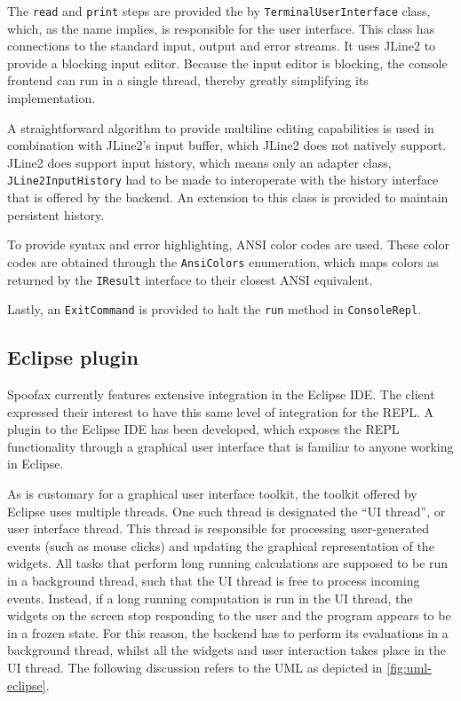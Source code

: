 The \texttt{read} and \texttt{print} steps are provided
the by \texttt{TerminalUserInterface} class, which, as the name implies, is
responsible for the user interface. This class has connections to the standard
input, output and error streams. It uses JLine2 to provide a blocking input
editor. Because the input editor is blocking, the console frontend can run in a
single thread, thereby greatly simplifying its implementation.

A straightforward algorithm to provide multiline editing capabilities is used in
combination with JLine2's input buffer, which JLine2 does not natively support.
JLine2 does support input history, which means only an adapter class,
\texttt{JLine2InputHistory} had to be made to interoperate with the history
interface that is offered by the backend. An extension to this class is provided
to maintain persistent history.

To provide syntax and error highlighting, ANSI color codes are used. These
color codes are obtained through the \texttt{AnsiColors} enumeration, which
maps colors as returned by the \texttt{IResult} interface to their closest
ANSI equivalent.

Lastly, an \texttt{ExitCommand} is provided to halt the \texttt{run} method
in \texttt{ConsoleRepl}.

\subsection{Eclipse plugin}
\label{ssec:eclipse-plugin}

Spoofax currently features extensive integration in the Eclipse IDE. The client
expressed their interest to have this same level of integration for the REPL. A
plugin to the Eclipse IDE has been developed, which exposes the REPL
functionality through a graphical user interface that is familiar to anyone
working in Eclipse.

As is customary for a graphical user interface toolkit, the toolkit offered by
Eclipse uses multiple threads. One such thread is designated the ``UI thread'',
or user interface thread. This thread is responsible for processing
user-generated events (such as mouse clicks) and updating the graphical
representation of the widgets. All tasks that perform long running
calculations are supposed to be run in a background thread, such that the UI
thread is free to process incoming events. Instead, if a long running
computation is run in the UI thread, the widgets on the screen stop responding
to the user and the program appears to be in a frozen state. For this reason,
the backend has to perform its evaluations in a background thread, whilst all
the widgets and user interaction takes place in the UI thread.
The following discussion refers to the UML as depicted in
\cref{fig:uml-eclipse}.

